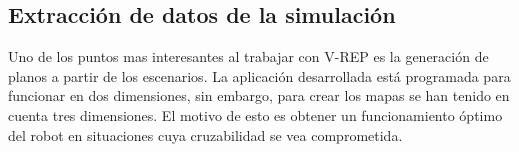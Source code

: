 \subsection{Extracción de datos de la simulación}

Uno de los puntos mas interesantes al trabajar con V-REP es la generación de planos a partir de los escenarios. La aplicación desarrollada está programada para funcionar en dos dimensiones, sin embargo, para crear los mapas se han tenido en cuenta tres dimensiones. El motivo de esto es obtener un funcionamiento óptimo del robot en situaciones cuya cruzabilidad se vea comprometida.

